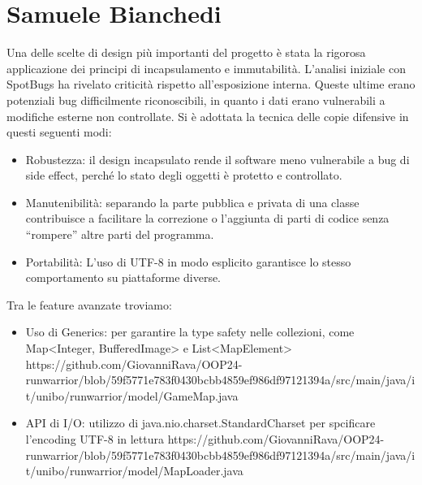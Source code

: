 \documentclass[a4paper,12pt]{report}
\begin{document}
\section{Samuele Bianchedi}
Una delle scelte di design più importanti del progetto è stata la rigorosa applicazione dei principi di incapsulamento e immutabilità.
L’analisi iniziale con SpotBugs ha rivelato criticità rispetto all’esposizione interna. 
Queste ultime erano potenziali bug difficilmente riconoscibili, in quanto i dati erano vulnerabili a modifiche esterne non controllate.
Si è adottata la tecnica delle copie difensive in questi seguenti modi:
\begin{itemize}
    \item Robustezza: il design incapsulato rende il software meno vulnerabile a bug di side effect, 
    perché lo stato degli oggetti è protetto e controllato.
    \item Manutenibilità: separando la parte pubblica e privata di una classe contribuisce a facilitare la correzione 
    o l’aggiunta di parti di codice senza “rompere” altre parti del programma.
    \item Portabilità: L’uso di UTF-8 in modo esplicito garantisce lo stesso comportamento su piattaforme diverse.
\end{itemize}
Tra le feature avanzate troviamo:
\begin{itemize}
    \item Uso di Generics: per garantire la type safety nelle collezioni, come Map<Integer, BufferedImage> e List<MapElement>
    https://github.com/GiovanniRava/OOP24-runwarrior/blob/59f5771e783f0430bcbb4859ef986df97121394a/src/main/java/it/unibo/runwarrior/model/GameMap.java
    \item API di I/O: utilizzo di java.nio.charset.StandardCharset per spcificare l’encoding UTF-8 in lettura
https://github.com/GiovanniRava/OOP24-runwarrior/blob/59f5771e783f0430bcbb4859ef986df97121394a/src/main/java/it/unibo/runwarrior/model/MapLoader.java
\end {itemize}
\end{document}
